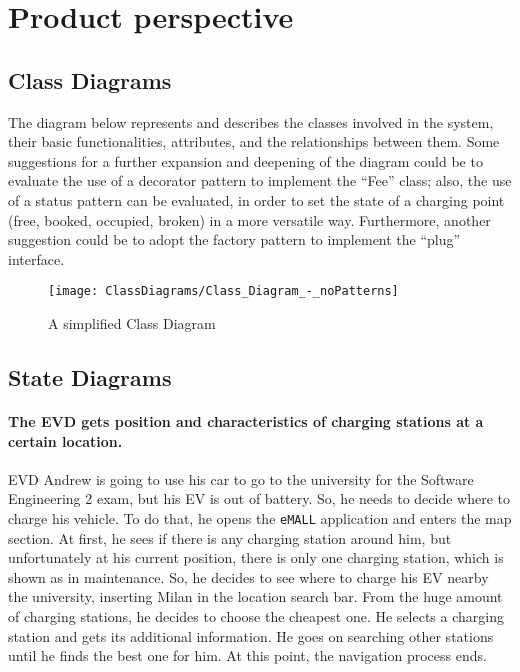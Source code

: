\section{Product perspective}
\label{sec:product_perspective}%

\subsection{Class Diagrams}
\label{subsec:class_diagrams}%
The diagram below represents and describes the classes involved in the system, their basic functionalities, attributes,
and the relationships between them.
Some suggestions for a further expansion and deepening of the diagram could be to evaluate the use of a decorator
pattern to implement the ``Fee'' class;
also, the use of a status pattern can be evaluated, in order to set the state of a charging point (free, booked, occupied, broken) in a more versatile way.
Furthermore, another suggestion could be to adopt the factory pattern to implement the ``plug'' interface.
\begin{figure}[H]
    \begin{center}
        \texttt{[image: ClassDiagrams/Class\_Diagram\_-\_noPatterns]}
        \caption{A simplified Class Diagram}
        \label{fig:class_diagram}%
    \end{center}
\end{figure}

\subsection{State Diagrams}
\label{subsec:state_diagrams}%

\paragraph{The EVD gets position and characteristics of charging stations at a certain location.}
EVD Andrew is going to use his car to go to the university for the Software Engineering 2 exam, but his EV is out of battery.
So, he needs to decide where to charge his vehicle.
To do that, he opens the \verb|eMALL| application and enters the map section.
At first, he sees if there is any charging station around him, but unfortunately at his current position,
there is only one charging station, which is shown as in maintenance.
So, he decides to see where to charge his EV nearby the university, inserting Milan in the location search bar.
From the huge amount of charging stations, he decides to choose the cheapest one.
He selects a charging station and gets its additional information.
He goes on searching other stations until he finds the best one for him.
At this point, the navigation process ends.

